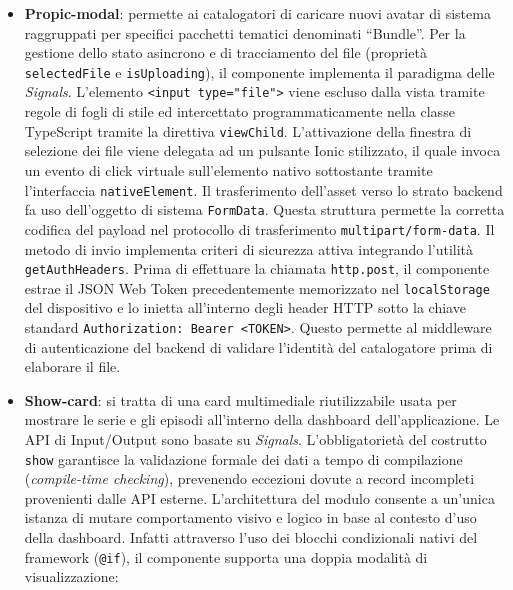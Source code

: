 \documentclass[11pt,a4paper]{article}
\begin{document}
\begin{itemize}
\begin{enumerate}
        Fornisce due bottoni grafici (\texttt{ion-button}) per i moderatori:
        \begin{itemize}
            \item \textbf{Approvazione}: Cambia colore (verde/grigio) e icona a seconda che sia già approvato o meno. Cliccando, chiama \texttt{onApprove()}.
            \item \textbf{Visibilità (Nascondi)}: Consente di oscurare il commento chiamando \texttt{onHide()}.
        \end{itemize}
    \end{enumerate}
    \item \textbf{Propic-modal}: permette ai catalogatori di caricare nuovi avatar di sistema raggruppati per specifici pacchetti tematici denominati ``Bundle''. Per la gestione dello stato asincrono e di tracciamento del file (proprietà \texttt{selectedFile} e \texttt{isUploading}), il componente implementa il paradigma delle \textit{Signals}. L'elemento \texttt{<input type="file">} viene escluso dalla vista tramite regole di fogli di stile ed intercettato programmaticamente nella classe TypeScript tramite la direttiva \texttt{viewChild}. L'attivazione della finestra di selezione dei file viene delegata ad un pulsante Ionic stilizzato, il quale invoca un evento di click virtuale sull'elemento nativo sottostante tramite l'interfaccia \texttt{nativeElement}. Il trasferimento dell'asset verso lo strato backend fa uso dell'oggetto di sistema \texttt{FormData}. Questa struttura permette la corretta codifica del payload nel protocollo di trasferimento \texttt{multipart/form-data}. Il metodo di invio implementa criteri di sicurezza attiva integrando l'utilità \texttt{getAuthHeaders}. Prima di effettuare la chiamata \texttt{http.post}, il componente estrae il JSON Web Token precedentemente memorizzato nel \texttt{localStorage} del dispositivo e lo inietta all'interno degli header HTTP sotto la chiave standard \texttt{Authorization: Bearer <TOKEN>}. Questo permette al middleware di autenticazione del backend di validare l'identità del catalogatore prima di elaborare il file.
    \item \textbf{Show-card}: si tratta di una card multimediale riutilizzabile usata per mostrare le serie e gli episodi all'interno della dashboard dell'applicazione. Le API di Input/Output sono basate su \textit{Signals}. L'obbligatorietà del costrutto \texttt{show} garantisce la validazione formale dei dati a tempo di compilazione (\textit{compile-time checking}), prevenendo eccezioni dovute a record incompleti provenienti dalle API esterne. L'architettura del modulo consente a un'unica istanza di mutare comportamento visivo e logico in base al contesto d'uso della dashboard. Infatti attraverso l'uso dei blocchi condizionali nativi del framework (\texttt{@if}), il componente supporta una doppia modalità di visualizzazione:

\end{itemize}
\end{document}
